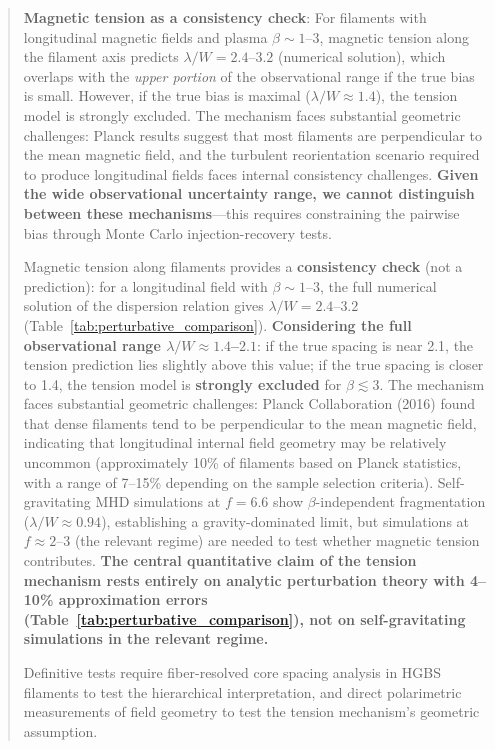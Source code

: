 \documentclass[11pt,a4paper]{article}
\begin{document}
\begin{abstract}
\textbf{Magnetic tension as a consistency check}: For filaments with longitudinal magnetic fields and plasma $\beta \sim 1$--$3$, magnetic tension along the filament axis predicts $\lambda/W = 2.4$--$3.2$ (numerical solution), which overlaps with the \textit{upper portion} of the observational range if the true bias is small. However, if the true bias is maximal ($\lambda/W \approx 1.4$), the tension model is strongly excluded. The mechanism faces substantial geometric challenges: Planck results suggest that most filaments are perpendicular to the mean magnetic field, and the turbulent reorientation scenario required to produce longitudinal fields faces internal consistency challenges. \textbf{Given the wide observational uncertainty range, we cannot distinguish between these mechanisms}—this requires constraining the pairwise bias through Monte Carlo injection-recovery tests.

Magnetic tension along filaments provides a \textbf{consistency check} (not a prediction): for a longitudinal field with $\beta \sim 1$--$3$, the full numerical solution of the dispersion relation gives $\lambda/W = 2.4$--$3.2$ (Table~\ref{tab:perturbative_comparison}). \textbf{Considering the full observational range $\lambda/W \approx 1.4$--$2.1$}: if the true spacing is near 2.1, the tension prediction lies slightly above this value; if the true spacing is closer to 1.4, the tension model is \textbf{strongly excluded} for $\beta \lesssim 3$. The mechanism faces substantial geometric challenges: Planck Collaboration (2016) found that dense filaments tend to be perpendicular to the mean magnetic field, indicating that longitudinal internal field geometry may be relatively uncommon (approximately 10\% of filaments based on Planck statistics, with a range of 7--15\% depending on the sample selection criteria). Self-gravitating MHD simulations at $f = 6.6$ show $\beta$-independent fragmentation ($\lambda/W \approx 0.94$), establishing a gravity-dominated limit, but simulations at $f \approx 2$--$3$ (the relevant regime) are needed to test whether magnetic tension contributes. \textbf{The central quantitative claim of the tension mechanism rests entirely on analytic perturbation theory with 4--10\% approximation errors (Table~\ref{tab:perturbative_comparison}), not on self-gravitating simulations in the relevant regime.}

Definitive tests require fiber-resolved core spacing analysis in HGBS filaments to test the hierarchical interpretation, and direct polarimetric measurements of field geometry to test the tension mechanism's geometric assumption.
\end{abstract}
\end{document}
